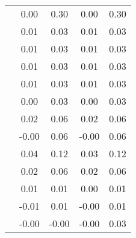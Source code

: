 \begin{table}
\begin{tabular}{c|cc|cc|}
\multicolumn{1}{|c|}{} & \multicolumn{1}{|c|}{      0.00} & \multicolumn{1}{|c|}{      0.30} & \multicolumn{1}{|c|}{      0.00} & \multicolumn{1}{|c|}{      0.30} \\ 
\multicolumn{1}{|c|}{} & \multicolumn{1}{|c|}{      0.01} & \multicolumn{1}{|c|}{      0.03} & \multicolumn{1}{|c|}{      0.01} & \multicolumn{1}{|c|}{      0.03} \\ 
\multicolumn{1}{|c|}{} & \multicolumn{1}{|c|}{      0.01} & \multicolumn{1}{|c|}{      0.03} & \multicolumn{1}{|c|}{      0.01} & \multicolumn{1}{|c|}{      0.03} \\ 
\multicolumn{1}{|c|}{} & \multicolumn{1}{|c|}{      0.01} & \multicolumn{1}{|c|}{      0.03} & \multicolumn{1}{|c|}{      0.01} & \multicolumn{1}{|c|}{      0.03} \\ 
\multicolumn{1}{|c|}{} & \multicolumn{1}{|c|}{      0.01} & \multicolumn{1}{|c|}{      0.03} & \multicolumn{1}{|c|}{      0.01} & \multicolumn{1}{|c|}{      0.03} \\ 
\multicolumn{1}{|c|}{} & \multicolumn{1}{|c|}{      0.00} & \multicolumn{1}{|c|}{      0.03} & \multicolumn{1}{|c|}{      0.00} & \multicolumn{1}{|c|}{      0.03} \\ 
\multicolumn{1}{|c|}{} & \multicolumn{1}{|c|}{      0.02} & \multicolumn{1}{|c|}{      0.06} & \multicolumn{1}{|c|}{      0.02} & \multicolumn{1}{|c|}{      0.06} \\ 
\multicolumn{1}{|c|}{} & \multicolumn{1}{|c|}{     -0.00} & \multicolumn{1}{|c|}{      0.06} & \multicolumn{1}{|c|}{     -0.00} & \multicolumn{1}{|c|}{      0.06} \\ 
\multicolumn{1}{|c|}{} & \multicolumn{1}{|c|}{      0.04} & \multicolumn{1}{|c|}{      0.12} & \multicolumn{1}{|c|}{      0.03} & \multicolumn{1}{|c|}{      0.12} \\ 
\multicolumn{1}{|c|}{} & \multicolumn{1}{|c|}{      0.02} & \multicolumn{1}{|c|}{      0.06} & \multicolumn{1}{|c|}{      0.02} & \multicolumn{1}{|c|}{      0.06} \\ 
\multicolumn{1}{|c|}{} & \multicolumn{1}{|c|}{      0.01} & \multicolumn{1}{|c|}{      0.01} & \multicolumn{1}{|c|}{      0.00} & \multicolumn{1}{|c|}{      0.01} \\ 
\multicolumn{1}{|c|}{} & \multicolumn{1}{|c|}{     -0.01} & \multicolumn{1}{|c|}{      0.01} & \multicolumn{1}{|c|}{     -0.00} & \multicolumn{1}{|c|}{      0.01} \\ 
\multicolumn{1}{|c|}{} & \multicolumn{1}{|c|}{     -0.00} & \multicolumn{1}{|c|}{     -0.00} & \multicolumn{1}{|c|}{     -0.00} & \multicolumn{1}{|c|}{      0.03} \\ 

\end{tabular}
\end{table}
